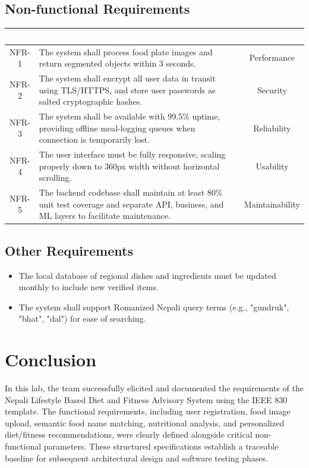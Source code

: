 \documentclass[11pt,a4paper]{article}
\newcommand{\reqheader}[3]{%
  \rowcolor{srsnavy}
  \textcolor{white}{\textbf{#1}} &
  \textcolor{white}{\textbf{#2}} &
  \textcolor{white}{\textbf{#3}} \\ \hline}
\begin{document}
\subsection{Non-functional Requirements}
\renewcommand{\arraystretch}{1.35}
\begin{tabularx}{\textwidth}{|c|X|c|}
\hline
\reqheader{ID}{Non-functional Requirement}{Category}
NFR-1 & The system shall process food plate images and return segmented objects within 3 seconds. & Performance \\ \hline
NFR-2 & The system shall encrypt all user data in transit using TLS/HTTPS, and store user passwords as salted cryptographic hashes. & Security \\ \hline
NFR-3 & The system shall be available with 99.5\% uptime, providing offline meal-logging queues when connection is temporarily lost. & Reliability \\ \hline
NFR-4 & The user interface must be fully responsive, scaling properly down to 360px width without horizontal scrolling. & Usability \\ \hline
NFR-5 & The backend codebase shall maintain at least 80\% unit test coverage and separate API, business, and ML layers to facilitate maintenance. & Maintainability \\ \hline
\end{tabularx}

\subsection{Other Requirements}
\begin{itemize}[leftmargin=*]
  \item The local database of regional dishes and ingredients must be updated monthly to include new verified items.
  \item The system shall support Romanized Nepali query terms (e.g., "gundruk", "bhat", "dal") for ease of searching.
\end{itemize}

\section{Conclusion}
In this lab, the team successfully elicited and documented the requirements of the Nepali Lifestyle Based Diet and Fitness Advisory System using the IEEE 830 template. The functional requirements, including user registration, food image upload, semantic food name matching, nutritional analysis, and personalized diet/fitness recommendations, were clearly defined alongside critical non-functional parameters. These structured specifications establish a traceable baseline for subsequent architectural design and software testing phases.
\end{document}

